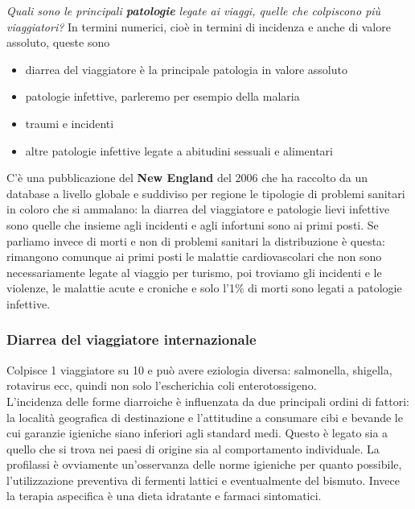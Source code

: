 \emph{Quali sono le principali \textbf{patologie} legate ai viaggi,
quelle che colpiscono più viaggiatori?} In termini numerici, cioè in
termini di incidenza e anche di valore assoluto, queste sono\\
\begin{itemize}
\item diarrea del viaggiatore è la principale patologia in valore assoluto\\
\item patologie infettive, parleremo per esempio della malaria\\
\item traumi e incidenti\\
\item altre patologie infettive legate a abitudini sessuali e alimentari
\end{itemize}

C'è una pubblicazione del \textbf{New England} del 2006 che ha raccolto
da un database a livello globale e suddiviso per regione le tipologie di
problemi sanitari in coloro che si ammalano: la diarrea del viaggiatore
e patologie lievi infettive sono quelle che insieme agli incidenti e
agli infortuni sono ai primi posti. Se parliamo invece di morti e non di
problemi sanitari la distribuzione è questa: rimangono comunque ai primi
posti le malattie cardiovascolari che non sono necessariamente legate al
viaggio per turismo, poi troviamo gli incidenti e le violenze, le
malattie acute e croniche e solo l'1\% di morti sono legati a patologie
infettive.

\subsubsection{Diarrea del viaggiatore internazionale}
Colpisce 1 viaggiatore su 10 e può avere eziologia diversa: salmonella,
shigella, rotavirus ecc, quindi non solo l'escherichia coli
enterotossigeno.\\
L'incidenza delle forme diarroiche è influenzata da due principali
ordini di fattori: la località geografica di destinazione e l'attitudine
a consumare cibi e bevande le cui garanzie igieniche siano inferiori
agli standard medi. Questo è legato sia a quello che si trova nei paesi
di origine sia al comportamento individuale. La profilassi è ovviamente
un'osservanza delle norme igieniche per quanto possibile,
l'utilizzazione preventiva di fermenti lattici e eventualmente del
bismuto. Invece la terapia aspecifica è una dieta idratante e farmaci
sintomatici.

